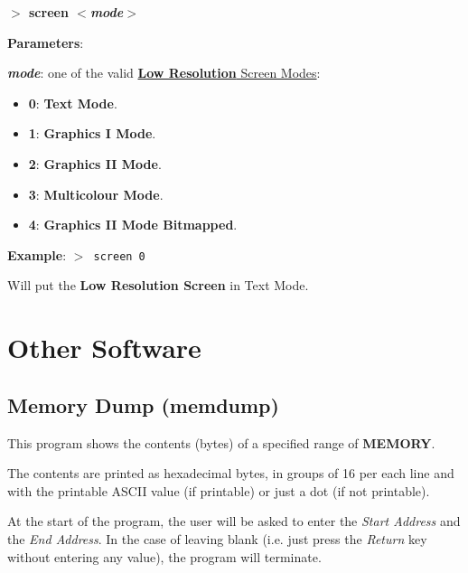 \documentclass[a4paper,11pt]{article}
\begin{document}
        \hspace{1.9cm}\textbf{$>$ screen \textit{$<$mode$>$}}

        \textbf{Parameters}:

        \hspace{1cm}\textbf{\textit{mode}}: one of the valid
        \hyperref[sec:vdpscrmodes]{\textbf{Low Resolution} Screen Modes}:

        \begin{itemize}
            \item \textbf{0}: \textbf{Text Mode}.
            \item \textbf{1}: \textbf{Graphics I Mode}.
            \item \textbf{2}: \textbf{Graphics II Mode}.
            \item \textbf{3}: \textbf{Multicolour Mode}.
            \item \textbf{4}: \textbf{Graphics II Mode Bitmapped}.
        \end{itemize}
        
        \textbf{Example}: \texttt{$>$ screen 0}

        Will put the \textbf{Low Resolution Screen} in Text Mode.

    \pagebreak
    \section{Other Software}

    \subsection{Memory Dump (memdump)}
    This program shows the contents (bytes) of a specified range of
    \textbf{MEMORY}.

    The contents are printed as hexadecimal bytes, in groups of 16 per each line
    and with the printable ASCII value (if printable) or just a dot (if not
    printable).

    At the start of the program, the user will be asked to enter the
    \textit{Start Address} and the \textit{End Address}. In the case of leaving
    blank (i.e. just press the \textit{Return} key without entering any value),
    the program will terminate.
\end{document}
